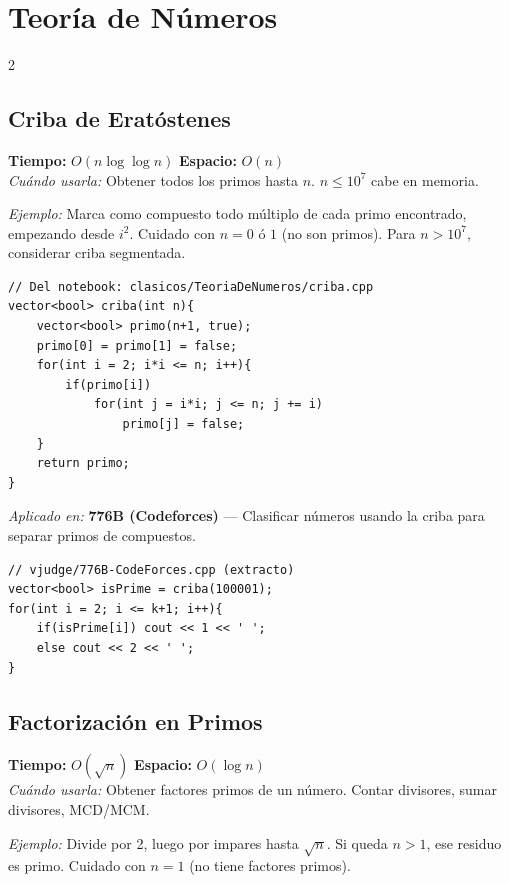 \documentclass[10pt,a4paper]{article}
\begin{document}
\section{Teor\'ia de N\'umeros}
\begin{multicols}{2}

\subsection{Criba de Erat\'ostenes}
\textbf{Tiempo:} $O(n \log \log n)$ \quad \textbf{Espacio:} $O(n)$\\
\textit{Cu\'ando usarla:} Obtener todos los primos hasta $n$. $n \leq 10^7$ cabe en memoria.

\textit{Ejemplo:} Marca como compuesto todo m\'ultiplo de cada primo encontrado, empezando desde $i^2$. Cuidado con $n = 0$ \'o $1$ (no son primos). Para $n > 10^7$, considerar criba segmentada.

\begin{lstlisting}
// Del notebook: clasicos/TeoriaDeNumeros/criba.cpp
vector<bool> criba(int n){
    vector<bool> primo(n+1, true);
    primo[0] = primo[1] = false;
    for(int i = 2; i*i <= n; i++){
        if(primo[i])
            for(int j = i*i; j <= n; j += i)
                primo[j] = false;
    }
    return primo;
}
\end{lstlisting}

\textit{Aplicado en:} \textbf{776B (Codeforces)} --- Clasificar n\'umeros usando la criba para separar primos de compuestos.

\begin{lstlisting}
// vjudge/776B-CodeForces.cpp (extracto)
vector<bool> isPrime = criba(100001);
for(int i = 2; i <= k+1; i++){
    if(isPrime[i]) cout << 1 << ' ';
    else cout << 2 << ' ';
}
\end{lstlisting}

\subsection{Factorizaci\'on en Primos}
\textbf{Tiempo:} $O(\sqrt{n})$ \quad \textbf{Espacio:} $O(\log n)$\\
\textit{Cu\'ando usarla:} Obtener factores primos de un n\'umero. Contar divisores, sumar divisores, MCD/MCM.

\textit{Ejemplo:} Divide por 2, luego por impares hasta $\sqrt{n}$. Si queda $n > 1$, ese residuo es primo. Cuidado con $n = 1$ (no tiene factores primos).


\end{multicols}
\end{document}
